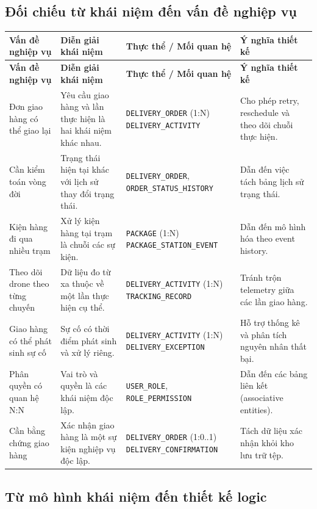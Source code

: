 \subsection{Đối chiếu từ khái niệm đến vấn đề nghiệp vụ} \renewcommand{\arraystretch}{1.15} \small \begin{longtable}{|p{3cm}|p{3.4cm}|p{4cm}|p{4.1cm}|} \hline \textbf{Vấn đề nghiệp vụ} & \textbf{Diễn giải khái niệm} & \textbf{Thực thể / Mối quan hệ} & \textbf{Ý nghĩa thiết kế} \\ \hline \endfirsthead \hline \textbf{Vấn đề nghiệp vụ} & \textbf{Diễn giải khái niệm} & \textbf{Thực thể / Mối quan hệ} & \textbf{Ý nghĩa thiết kế} \\ \hline \endhead Đơn giao hàng có thể giao lại & Yêu cầu giao hàng và lần thực hiện là hai khái niệm khác nhau. & \texttt{DELIVERY\_ORDER} (1:N) \texttt{DELIVERY\_ACTIVITY} & Cho phép retry, reschedule và theo dõi chuỗi thực hiện. \\ \hline Cần kiểm toán vòng đời & Trạng thái hiện tại khác với lịch sử thay đổi trạng thái. & \texttt{DELIVERY\_ORDER}, \texttt{ORDER\_STATUS\_HISTORY} & Dẫn đến việc tách bảng lịch sử trạng thái. \\ \hline Kiện hàng đi qua nhiều trạm & Xử lý kiện hàng tại trạm là chuỗi các sự kiện. & \texttt{PACKAGE} (1:N) \texttt{PACKAGE\_STATION\_EVENT} & Dẫn đến mô hình hóa theo event history. \\ \hline Theo dõi drone theo từng chuyến & Dữ liệu đo từ xa thuộc về một lần thực hiện cụ thể. & \texttt{DELIVERY\_ACTIVITY} (1:N) \texttt{TRACKING\_RECORD} & Tránh trộn telemetry giữa các lần giao hàng. \\ \hline Giao hàng có thể phát sinh sự cố & Sự cố có thời điểm phát sinh và xử lý riêng. & \texttt{DELIVERY\_ACTIVITY} (1:N) \texttt{DELIVERY\_EXCEPTION} & Hỗ trợ thống kê và phân tích nguyên nhân thất bại. \\ \hline Phân quyền có quan hệ N:N & Vai trò và quyền là các khái niệm độc lập. & \texttt{USER\_ROLE}, \texttt{ROLE\_PERMISSION} & Dẫn đến các bảng liên kết (associative entities). \\ \hline Cần bằng chứng giao hàng & Xác nhận giao hàng là một sự kiện nghiệp vụ độc lập. & \texttt{DELIVERY\_ORDER} (1:0..1) \texttt{DELIVERY\_CONFIRMATION} & Tách dữ liệu xác nhận khỏi kho lưu trữ tệp. \\ \hline \end{longtable} \normalsize

\subsection{Từ mô hình khái niệm đến thiết kế logic}

